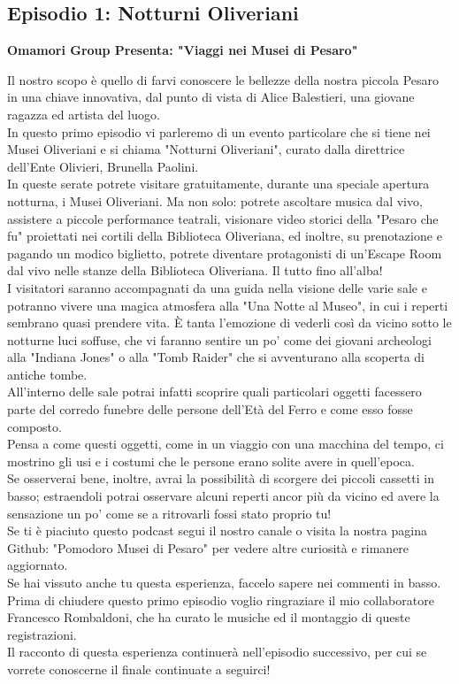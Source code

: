\documentclass[hidelinks,12pt,a4paper]{article}
\begin{document}
\begin{flushleft}
		\subsection{Episodio 1: Notturni Oliveriani}
		\begin{center}
			\textbf{Omamori Group Presenta: "Viaggi nei Musei di Pesaro"}
		\end{center}
		Il nostro scopo è quello di farvi conoscere le bellezze della nostra piccola Pesaro in una chiave innovativa, dal punto di vista di Alice Balestieri, una giovane ragazza ed artista del luogo.\\
		In questo primo episodio vi parleremo di un evento particolare che si tiene nei Musei Oliveriani e si chiama "Notturni Oliveriani", curato dalla direttrice dell'Ente Olivieri, Brunella Paolini.\\
		In queste serate potrete visitare gratuitamente, durante una speciale apertura notturna, i Musei Oliveriani. Ma non solo: potrete ascoltare musica dal vivo, assistere a piccole performance teatrali, visionare video storici della "Pesaro che fu" proiettati nei cortili della Biblioteca Oliveriana, ed inoltre, su prenotazione e pagando un modico biglietto, potrete diventare protagonisti di un'Escape Room dal vivo nelle stanze della Biblioteca Oliveriana. Il tutto fino all'alba!\\
		I visitatori saranno accompagnati da una guida nella visione delle varie sale e potranno vivere una magica atmosfera alla "Una Notte al Museo", in cui i reperti sembrano quasi prendere vita. È tanta l'emozione di vederli così da vicino sotto le notturne luci soffuse, che vi faranno sentire un po' come dei giovani archeologi alla "Indiana Jones" o alla "Tomb Raider" che si avventurano alla scoperta di antiche tombe.\\
		All'interno delle sale potrai infatti scoprire quali particolari oggetti facessero parte del corredo funebre delle persone dell'Età del Ferro e come esso fosse composto.\\
		Pensa a come questi oggetti, come in un viaggio con una macchina del tempo, ci mostrino gli usi e i costumi che le persone erano solite avere in quell'epoca.\\
		Se osserverai bene, inoltre, avrai la possibilità di scorgere dei piccoli cassetti in basso; estraendoli potrai osservare alcuni reperti ancor più da vicino ed avere la sensazione un po' come se a ritrovarli fossi stato proprio tu!\\
		Se ti è piaciuto questo podcast segui il nostro canale o visita la nostra pagina Github: "Pomodoro Musei di Pesaro" per vedere altre curiosità e rimanere aggiornato.\\
		Se hai vissuto anche tu questa esperienza, faccelo sapere nei commenti in basso.\\
		Prima di chiudere questo primo episodio voglio ringraziare il mio collaboratore Francesco Rombaldoni, che ha curato le musiche ed il montaggio di queste registrazioni.\\
		Il racconto di questa esperienza continuerà nell'episodio successivo, per cui se vorrete conoscerne il finale continuate a seguirci!\\
		

\end{flushleft}
\end{document}
